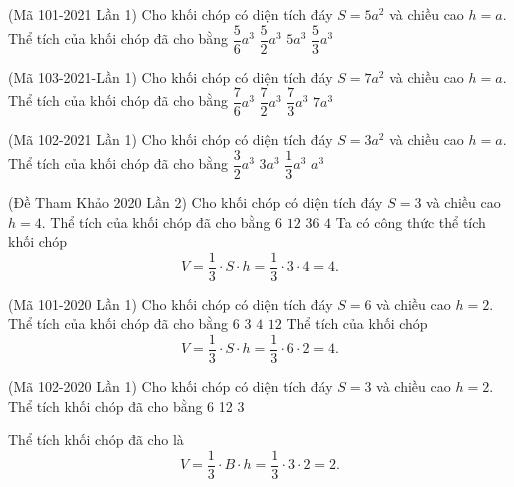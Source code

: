 \begin{ex}%
	(Mã 101-2021 Lần 1) Cho khối chóp có diện tích đáy $ S=5a^2$ và chiều cao $ h=a$. Thể tích của khối chóp đã cho bằng
	\choice
	{$\dfrac{5}{6}{a^3}$}
	{$\dfrac{5}{2}{a^3}$}
	{$ 5a^3$}
	{\True $\dfrac{5}{3}{a^3}$}
\end{ex}

\begin{ex}%
	(Mã 103-2021-Lần 1) Cho khối chóp có diện tích đáy $ S=7a^2$ và chiều cao $ h=a$. Thể tích của khối chóp đã cho bằng
	\choice
	{$\dfrac{7}{6}{a^3}$}
	{$\dfrac{7}{2}{a^3}$}
	{\True $\dfrac{7}{3}{a^3}$}
	{$ 7a^3$}
\end{ex}

\begin{ex}%
	(Mã 102-2021 Lần 1) Cho khối chóp có diện tích đáy $ S=3a^2$ và chiều cao $ h=a$. Thể tích của khối chóp đã cho bằng
	\choice
	{$\dfrac{3}{2}{a^3}$}
	{$ 3a^3$}
	{$\dfrac{1}{3}{a^3}$}
	{\True $a^3$}
\end{ex}

\begin{ex}%
	(Đề Tham Khảo 2020 Lần 2) Cho khối chóp có diện tích đáy $ S=3$ và chiều cao $ h=4$. Thể tích của khối chóp đã cho bằng
	\choice
	{$ 6$}
	{$ 12$}
	{$ 36$}
	{\True $4$}
	\loigiai
	{
		Ta có công thức thể tích khối chóp
		$$ V=\dfrac{1}{3}\cdot S\cdot h=\dfrac{1}{3}\cdot3\cdot4=4.$$}
\end{ex}

\begin{ex}%
	(Mã 101-2020 Lần 1) Cho khối chóp có diện tích đáy $ S=6$ và chiều cao $ h=2$. Thể tích của khối chóp đã cho bằng
	\choice
	{$ 6$}
	{$ 3$}
	{\True $ 4$}
	{$ 12$}
	\loigiai
	{
		Thể tích của khối chóp $$ V=\dfrac{1}{3}\cdot S \cdot h=\dfrac{1}{3}\cdot 6 \cdot 2=4.$$}
\end{ex}

\begin{ex}%
	(Mã 102-2020 Lần 1) Cho khối chóp có diện tích đáy $S=3$ và chiều cao $h=2$. Thể tích khối chóp đã cho bằng
	\choice
	{6}
	{12}
	{}
	{3}
	\loigiai
	{
		Thể tích khối chóp đã cho là
		$$V=\dfrac{1}{3}\cdot B \cdot h=\dfrac{1}{3} \cdot 3 \cdot 2=2.$$
		
	}
\end{ex}

